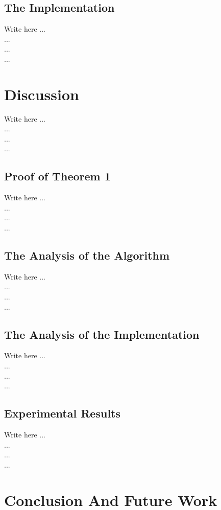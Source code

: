 \documentclass[conference]{IEEEtran}
\begin{document}
\subsection{The Implementation}
    Write here ... \\
    ...  \\
    ...  \\
    ...  

\section{Discussion}

    Write here ... \\
    ...  \\
    ...  \\
    ...  
\subsection*{Proof of Theorem 1}
    Write here ... \\
    ...  \\
    ...  \\
    ...  
    
\subsection{The Analysis of the Algorithm}\label{AA}
    Write here ... \\
    ...  \\
    ...  \\
    ...  

\subsection{The Analysis of the Implementation}
    Write here ... \\
    ...  \\
    ...  \\
    ...  
\subsection{Experimental Results}
    Write here ... \\
    ...  \\
    ...  \\
    ...     


\section{Conclusion And Future Work}
\end{document}

